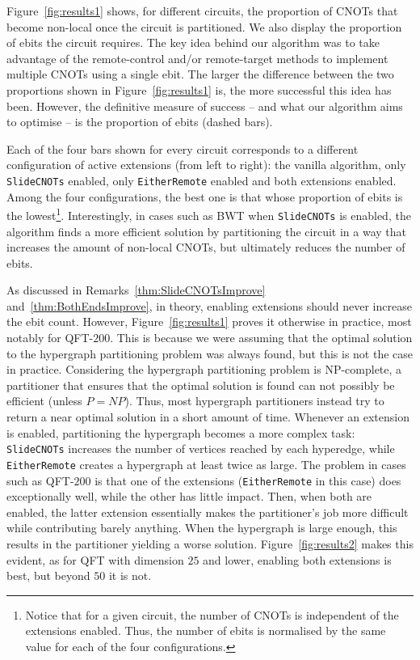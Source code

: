 Figure~\ref{fig:results1} shows, for different circuits, the proportion of CNOTs that become non-local once the circuit is partitioned. We also display the proportion of ebits the circuit requires. The key idea behind our algorithm was to take advantage of the remote-control and/or remote-target methods to implement multiple CNOTs using a single ebit. The larger the difference between the two proportions shown in Figure~\ref{fig:results1} is, the more successful this idea has been. However, the definitive measure of success -- and what our algorithm aims to optimise -- is the proportion of ebits (dashed bars). 



Each of the four bars shown for every circuit corresponds to a different configuration of active extensions (from left to right): the vanilla algorithm, only \texttt{SlideCNOTs} enabled, only \texttt{EitherRemote} enabled and both extensions enabled. Among the four configurations, the best one is that whose proportion of ebits is the lowest\footnote{Notice that for a given circuit, the number of CNOTs is independent of the extensions enabled. Thus, the number of ebits is normalised by the same value for each of the four configurations.}. Interestingly, in cases such as BWT when \texttt{SlideCNOTs} is enabled, the algorithm finds a more efficient solution by partitioning the circuit in a way that increases the amount of non-local CNOTs, but ultimately reduces the number of ebits.

As discussed in Remarks~\ref{thm:SlideCNOTsImprove} and~\ref{thm:BothEndsImprove}, in theory, enabling extensions should never increase the ebit count. However, Figure~\ref{fig:results1} proves it otherwise in practice, most notably for QFT-\(200\). This is because we were assuming that the optimal solution to the hypergraph partitioning problem was always found, but this is not the case in practice. Considering the hypergraph partitioning problem is NP-complete, a partitioner that ensures that the optimal solution is found can not possibly be efficient (unless \(P=NP\)). Thus, most hypergraph partitioners instead try to return a near optimal solution in a short amount of time. Whenever an extension is enabled, partitioning the hypergraph becomes a more complex task: \texttt{SlideCNOTs} increases the number of vertices reached by each hyperedge, while \texttt{EitherRemote} creates a hypergraph at least twice as large. The problem in cases such as QFT-\(200\) is that one of the extensions (\texttt{EitherRemote} in this case) does exceptionally well, while the other has little impact. Then, when both are enabled, the latter extension essentially makes the partitioner's job more difficult while contributing barely anything. When the hypergraph is large enough, this results in the partitioner yielding a worse solution. Figure~\ref{fig:results2} makes this evident, as for QFT with dimension \(25\) and lower, enabling both extensions is best, but beyond \(50\) it is not. 

